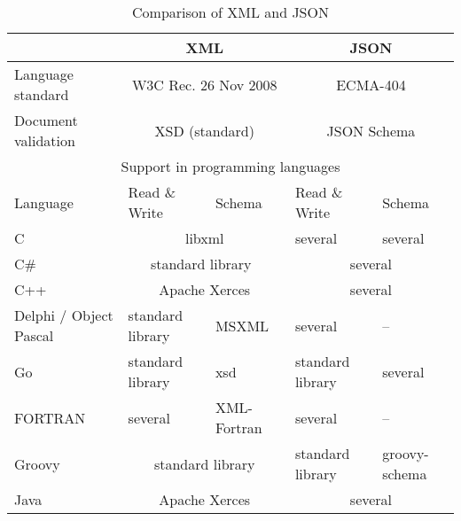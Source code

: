 \documentclass[11pt,a4paper]{article}
\begin{document}
\begin{longtable}[h!]{|p{30mm}|p{25mm}|p{20mm}|p{25mm}|p{25mm}|}
\caption{Comparison of XML and JSON} \\

\hline
\label{tab:xml-json-comparison} & \multicolumn{2}{c|}{XML} & \multicolumn{2}{c|}{JSON} \\
\hline
Language standard        & \multicolumn{2}{c|}{W3C Rec. 26 Nov 2008 \cite{W3C2008}} &
                  \multicolumn{2}{c|}{ECMA-404 \cite{Ecma2017}} \\
\hline
Document validation & \multicolumn{2}{c|}{XSD (standard) \cite{W3C2012} } &
\multicolumn{2}{c|}{JSON Schema \cite{jsonschema} } \\
\hline
\multicolumn{5}{|c|}{Support in programming languages} \\
Language & Read \& Write & Schema & Read \& Write & Schema \\
\hline
C   & \multicolumn{2}{c|}{libxml \cite{libxml}} & several \cite{json} & several \cite{json, jsonschema-implementations} \\
\hline
C\#  & \multicolumn{2}{c|}{standard library~\cite{csharp-xml}}  & \multicolumn{2}{c|}{several \cite{json}} \\
\hline
C++ & \multicolumn{2}{c|}{Apache Xerces \cite{xerces-c++}} & \multicolumn{2}{c|}{ several \cite{json, jsonschema-implementations} } \\
\hline
Delphi / Object Pascal & standard library \cite{delphi-txml, delphi-write-xml} & MSXML \cite{delphi-validate-xml} & several \cite{json} & -- \\
\hline
Go & standard library \cite{go-xml} & xsd \cite{go-xsd} & standard library \cite{go-json} & several \cite{jsonschema-implementations} \\
\hline
FORTRAN & several \cite{xml-fortran, foxy} & XML-Fortran \cite{xml-fortran} & several \cite{json} & -- \\
\hline
Groovy & \multicolumn{2}{c|}{standard library \cite{groovy-xml, Shields2012}} & standard library \cite{groovy-json} & groovy-schema \cite{groovyschema} \\
\hline
Java & \multicolumn{2}{c|}{Apache Xerces \cite{xerces-java}} & \multicolumn{2}{c|}{ several \cite{json, jsonschema-implementations} } \\


\end{longtable}
\end{document}
